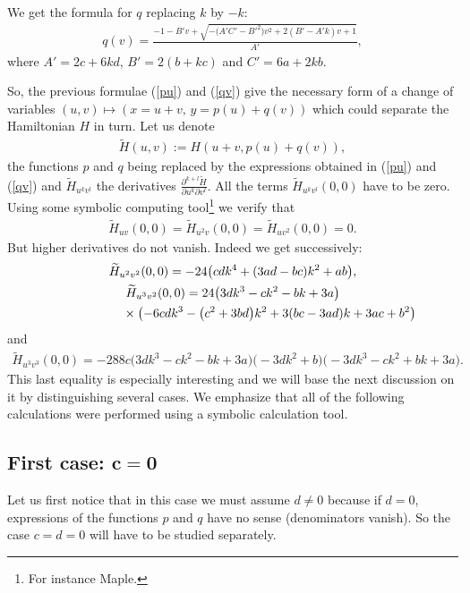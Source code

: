 \documentclass[pdftex]{sigma}%
\numberwithin{equation}{section}
\begin{document}
We get the formula for $q$ replacing $k$ by $-k$:
\begin{gather}\label{qv}
q(v)=\frac{-1-B'v+\sqrt{-\big(A'C'-B'^2\big)v^2+2(B'-A'k)v+1}}{A'},
\end{gather}
where $A'=2c+6kd$, $B'=2(b+kc)$ and $C'=6a+2kb$.

So, the previous formulae (\ref{pu}) and (\ref{qv}) give the necessary form of a change of variables $(u,v)\mapsto(x=u+v,\,y=p(u)+q(v))$ which could separate the Hamiltonian $H$ in turn. Let us denote
\begin{gather*}
\widetilde{H}(u,v):=H(u+v,p(u)+q(v)),
\end{gather*}
the functions $p$ and $q$ being replaced by the expressions obtained in (\ref{pu}) and (\ref{qv}) and $\widetilde{H}_{u^kv^l}$ the derivatives $\frac{\partial^{k+l}\widetilde{H}}{\partial u^k\partial v^l}$.
All the terms $\widetilde{H}_{u^kv^l}(0,0)$ have to be zero. Using some symbolic computing tool\footnote{For instance Maple.} we verify that
\begin{gather*}
\widetilde{H}_{uv}(0,0)=\widetilde{H}_{u^2v}(0,0)=\widetilde{H}_{uv^2}(0,0)=0.
\end{gather*}
But higher derivatives do not vanish. Indeed we get successively:
\begin{gather}\label{eq1}
\widetilde{H}_{u^2v^2}(0,0)=-24\big(cdk^4+(3ad-bc)k^2+ab\big),
\\
\widetilde{H}_{u^3v^2}(0,0)=24\big(3dk^3-ck^2-bk+3a\big)\nonumber
\\ \hphantom{\widetilde{H}_{u^3v^2}(0,0)=}
{}\times\big({-}6cdk^3-\big(c^2+3bd\big)k^2+3(bc-3ad)k+3ac+b^2\big)
\label{eq2}
\end{gather}
and
\begin{gather}\label{eq3}
\widetilde{H}_{u^3v^3}(0,0)=-288c\big(3dk^3-ck^2-bk+3a\big)\big({-}3dk^2+b\big)\big({-}3dk^3-ck^2+bk+3a\big).
\end{gather}
This last equality is especially interesting and we will base the next discussion on it by distinguishing several cases. We emphasize that all of the following calculations were performed using a symbolic calculation tool.

\subsection*{First case: $\boldsymbol {c=0}$}

Let us first notice that in this case we must assume $d\not=0$ because if $d=0$, expressions of the functions $p$ and $q$ have no sense (denominators vanish). So the case $c=d=0$ will have to be studied separately.
\end{document}
